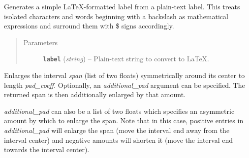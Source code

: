 \documentclass[a4paper,10pt,english]{sphinxmanual}
\begin{document}

\begin{fulllineitems}
\label{module_doc:kafe.plot.label_to_latex}
Generates a simple LaTeX-formatted label from a plain-text label.
This treats isolated characters and words beginning with a backslash
as mathematical expressions and surround them with \$ signs accordingly.
\begin{quote}\begin{description}
\item[{Parameters}] \leavevmode
\textbf{\texttt{label}} (\emph{string}) -- Plain-text string to convert to LaTeX.

\end{description}\end{quote}

\end{fulllineitems}


\begin{fulllineitems}
\label{module_doc:kafe.plot.pad_span}
Enlarges the interval \emph{span} (list of two floats) symmetrically around
its center to length \emph{pad\_coeff}. Optionally, an \emph{additional\_pad} argument
can be specified. The returned span is then additionally enlarged by that
amount.

\emph{additional\_pad} can also be a list of two floats which specifies an
asymmetric amount by which to enlarge the span. Note that in this case,
positive entries in \emph{additional\_pad} will enlarge the span (move the
interval end away from the interval center) and negative amounts will
shorten it (move the interval end towards the interval center).

\end{fulllineitems}


\begin{fulllineitems}
\label{module_doc:kafe.plot.pad_span_log}
\end{fulllineitems}
\end{document}
